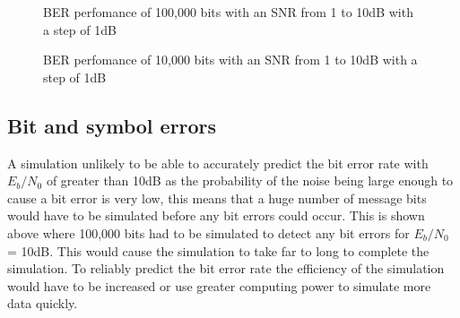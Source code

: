 \begin{figure}[H]
    \begin{center}
        
    \end{center}
    \caption{BER perfomance of 100,000 bits with an SNR from 1 to 10dB with a step of 1dB}
    \label{fig:bit-error}
\end{figure}

\begin{figure}[H]
    \begin{center}
        
    \end{center}
    \caption{BER perfomance of 10,000 bits with an SNR from 1 to 10dB with a step of 1dB}
    \label{fig:bit-error-10000}
\end{figure}

\subsection{Bit and symbol errors}
A simulation unlikely to be able to accurately predict the bit error rate with $E_b/N_0$ of greater
than 10dB as the probability of the noise being large enough to cause a bit error is very
low, this means that a huge number of message bits would have to be simulated before any
bit errors could occur. This is shown above where 100,000 bits had to be simulated to detect any
bit errors for $E_b/N_0$ = 10dB. This would cause the simulation to take far to long to complete
the simulation. To reliably predict the bit error rate the efficiency of the simulation would
have to be increased or use greater computing power to simulate more data quickly.